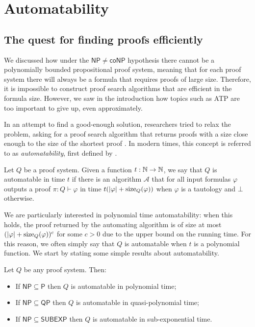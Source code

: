 \chapter{Automatability} \label{chap:automatability}

\section{The quest for finding proofs efficiently}

We discussed how under the $\mathsf{NP} \neq \mathsf{coNP}$ hypothesis there cannot be a polynomially bounded propositional proof system, meaning that for each proof system there will always be a formula that requires proofs of large size. Therefore, it is impossible to construct proof search algorithms that are efficient in the formula size. However, we saw in the introduction how topics such as ATP are too important to give up, even approximately.

In an attempt to find a good-enough solution, researchers tried to relax the problem, asking for a proof search algorithm that returns proofs with a size close enough to the size of the shortest proof \cite{psp_res, res_wphard}. In modern times, this concept is referred to as \textit{automatability}, first defined by \textcite{no_fis_int}.

\begin{definition}[Automatability]
    Let $Q$ be a proof system. Given a function $t : \mathbb{N} \to \mathbb{N}$, we say that $Q$ is automatable in time $t$ if there is an algorithm $\mathcal{A}$ that for all input formulas $\varphi$ outputs a proof $\pi : Q \vdash \varphi$  in time $t(\left|\varphi\right| + \mathrm{size}_Q(\varphi))$ when $\varphi$ is a tautology and $\bot$ otherwise.
\end{definition}

We are particularly interested in polynomial time automatability: when this holds, the proof returned by the automating algorithm is of size at most $(\left|\varphi\right| + \mathrm{size}_Q(\varphi))^c$ for some $c > 0$ due to the upper bound on the running time. For this reason, we often simply say that $Q$ is automatable when $t$ is a polynomial function. We start by stating some simple results about automatability.

\begin{proposition}
    \label{prop:auto_p_np}
    Let $Q$ be any proof system. Then:
    \begin{itemize}[nosep]
        \item If $\mathsf{NP} \subseteq \mathsf{P}$ then $Q$ is automatable in polynomial time;
        \item If $\mathsf{NP} \subseteq \mathsf{QP}$ then $Q$ is automatable in quasi-polynomial time;
        \item If $\mathsf{NP} \subseteq \mathsf{SUBEXP}$ then $Q$ is automatable in sub-exponential time.
    \end{itemize}
\end{proposition}

